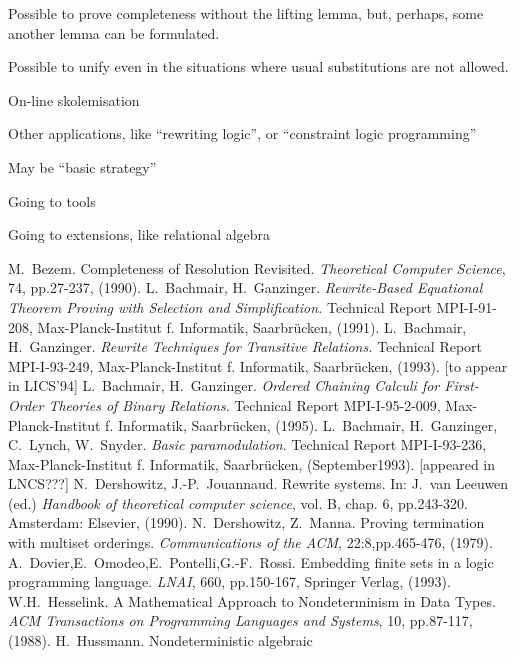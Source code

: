Possible to prove completeness without the lifting lemma, but, perhaps, some
another lemma can be formulated.

Possible to unify even in the situations where usual substitutions are not
allowed.

On-line skolemisation

Other applications, like ``rewriting logic'', or ``constraint logic
programming''

May be ``basic strategy''

Going to tools

Going to extensions, like relational algebra


\begin{thebibliography}{MM99}\smallerspaces
{} M.~Bezem. 
   Completeness of Resolution Revisited. 
   {\em Theoretical Computer Science}, 74, pp.27-237, (1990).
 L.~Bachmair, H.~Ganzinger. 
   {\em Rewrite-Based Equational Theorem Proving with 
                           Selection and Simplification.}
   Technical Report MPI-I-91-208, Max-Planck-Institut f. Informatik, 
   Saarbr\"ucken, (1991).
 L.~Bachmair, H.~Ganzinger. 
   {\em Rewrite Techniques for Transitive Relations.}
   Technical Report MPI-I-93-249, Max-Planck-Institut f. Informatik, 
   Saarbr\"ucken, (1993). [to appear in LICS'94]
 L.~Bachmair, H.~Ganzinger. 
   {\it Ordered Chaining Calculi for First-Order Theories of Binary Relations}.
   Technical Report MPI-I-95-2-009, Max-Planck-Institut f. Informatik, 
   Saarbr\"ucken, (1995).
 L.~Bachmair, H.~Ganzinger, C.~Lynch,  W.~Snyder. 
   {\em Basic paramodulation}.
   Technical Report MPI-I-93-236, Max-Planck-Institut f. Informatik, 
   Saarbr\"ucken, (September1993). [appeared in LNCS???]
 N.~Dershowitz, J.-P.~Jouannaud. 
   Rewrite systems. In: J.~van Leeuwen (ed.) 
   {\em Handbook of theoretical computer science}, vol. B,
   chap. 6, pp.243-320. Amsterdam: Elsevier, (1990).
 N.~Dershowitz, Z.~Manna. 
   Proving termination with multiset orderings. 
   {\em Communications of the ACM}, 22:8,pp.465-476, (1979).
 A.~Dovier,E.~Omodeo,E.~Pontelli,G.-F.~Rossi. 
   Embedding finite sets in a logic programming language. 
   {\em LNAI}, 660, pp.150-167, Springer Verlag, (1993).
 W.H.~Hesselink. A Mathematical Approach to Nondeterminism
   in Data Types. {\em ACM Transactions on Programming Languages and Systems},
   10, pp.87-117, (1988).
 H.~Hussmann. Nondeterministic algebraic

\end{thebibliography}
